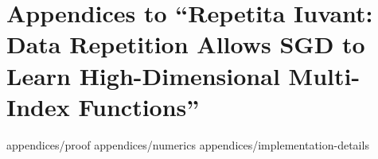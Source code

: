 \chapter[Repetita Iuvant]{Appendices to ``Repetita Iuvant: Data Repetition Allows SGD to Learn High-Dimensional Multi-Index Functions''}
\label{chap:appendix-2405}

{appendices/proof}
{appendices/numerics}
{appendices/implementation-details}
